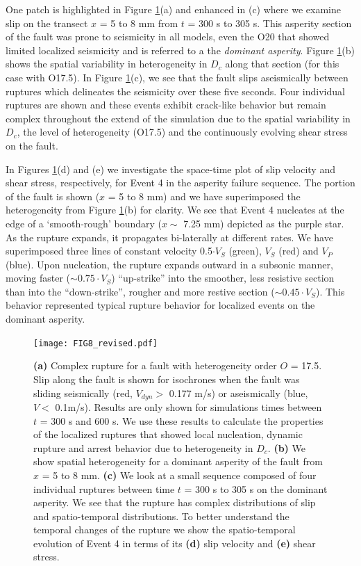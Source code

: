 \documentclass[preprint,1p, 10pt,authoryear]{elsarticle}
\begin{document}
One patch is highlighted in Figure \ref{fig8}(a) and enhanced in (c) where we examine slip on the transect $x$ = 5 to 8 mm from $t$ = 300 s to 305 s.  This asperity section of the fault was prone to seismicity in all models, even the O20 that showed limited localized seismicity and is referred to a the \textit{dominant asperity}. Figure \ref{fig8}(b) shows the spatial variability in heterogeneity in $D_{c}$ along that section (for this case with O17.5). In Figure \ref{fig8}(c), we see that the fault slips aseismically between ruptures which delineates the seismicity over these five seconds. Four individual ruptures are shown and these events exhibit crack-like behavior but remain complex throughout the extend of the simulation due to the spatial variability in $D_{c}$, the level of heterogeneity (O17.5) and the continuously evolving shear stress on the fault.

In Figures \ref{fig8}(d) and (e) we investigate the space-time plot of slip velocity and shear stress, respectively, for Event 4 in the asperity failure sequence. The portion of the fault is shown ($x$ = 5 to 8 mm) and we have superimposed the heterogeneity from Figure \ref{fig8}(b) for clarity. We see that Event 4 nucleates at the edge of a `smooth-rough' boundary ($x \sim$ 7.25 mm) depicted as the purple star. As the rupture expands, it propagates bi-laterally at different rates. We have superimposed three lines of constant velocity 0.5$\cdot V_{S}$ (green), $V_{S}$ (red) and $V_{P}$ (blue).  Upon nucleation, the rupture expands outward in a subsonic manner, moving faster ($\sim 0.75 \cdot V_{S}$) ``up-strike'' into the smoother, less resistive section than into the ``down-strike'', rougher and more restive section ($\sim 0.45\cdot V_{S}$). This behavior represented typical rupture behavior for localized events on the dominant asperity.

\begin{figure}
	\centering
	\texttt{[image: FIG8\_revised.pdf]} 
	\caption{\textbf{(a)} Complex rupture for a fault with heterogeneity order $O$ = 17.5. Slip along the fault is shown for isochrones when the fault was sliding seismically (red, $V_{dyn}>$ 0.177 m/s) or aseismically (blue, $V <$ 0.1m/s).  Results are only shown for simulations times between $t$ = 300 s and 600 s. We use these results to calculate the properties of the localized ruptures that showed local nucleation, dynamic rupture and arrest behavior due to heterogeneity in $D_{c}$. \textbf{(b)} We show spatial heterogeneity for a dominant asperity of the fault from $x$ = 5 to 8 mm. \textbf{(c)} We look at a small sequence composed of four individual ruptures between time $t$ = 300 s to 305 s on the dominant asperity.  We see that the rupture has complex distributions of slip and spatio-temporal distributions. To better understand the temporal changes of the rupture we show the spatio-temporal evolution of Event 4 in terms of its \textbf{(d)} slip velocity and \textbf{(e)} shear stress.}
	\label{fig8}
\end{figure}
\end{document}
